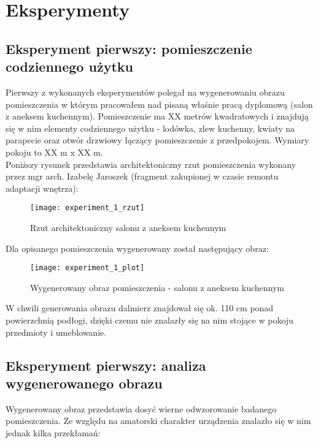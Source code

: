 \section {Eksperymenty}
\subsection {Eksperyment pierwszy: pomieszczenie codziennego użytku}
Pierwszy z wykonanych eksperymentów polegał na wygenerowaniu obrazu pomieszczenia w którym pracowałem nad pisaną właśnie pracą dyplomową (salon z aneksem kuchennym).
Pomieszczenie ma XX metrów kwadratowych i znajdują się w nim elementy codziennego użytku - lodówka, zlew kuchenny, kwiaty na parapecie oraz otwór drzwiowy łączący pomieszczenie z przedpokojem. Wymiary pokoju to XX m x XX m.\\

Poniższy rysunek przedstawia architektoniczny rzut pomieszczenia wykonany przez mgr arch. Izabelę Jaroszek (fragment zakupionej w czasie remontu adaptacji wnętrza):
\begin{figure}[h]
    \centering
    \texttt{[image: experiment\_1\_rzut]}
    \caption{Rzut architektoniczny salonu z aneksem kuchennym}
    \label{fig:experiment_1_rzut}
\end{figure}

Dla opisanego pomieszczenia wygenerowany został następujący obraz:
\begin{figure}[h]
    \centering
    \texttt{[image: experiment\_1\_plot]}
    \caption{Wygenerowany obraz pomieszczenia - salonu z aneksem kuchennym}
    \label{fig:experiment_1_plot}
\end{figure}

W chwili generowania obrazu dalmierz znajdował się ok. 110 cm ponad powierzchnią podłogi, dzięki czemu nie znalazły się na nim stojące w pokoju przedmioty i umeblowanie.

\subsection {Eksperyment pierwszy: analiza wygenerowanego obrazu}

Wygenerowany obraz przedstawia dosyć wierne odwzorowanie badanego pomieszczenia. Ze względu na amatorski charakter urządzenia znalazło się w nim jednak kilka przekłamań:

